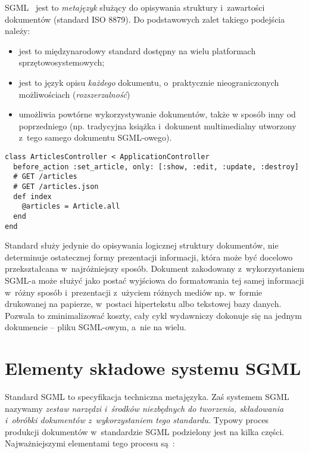\documentclass[brudnopis]{xmgr}
\begin{document}
SGML~\cite{Goldfarb:2002:CFG} jest to \emph{metajęzyk} służący do opisywania
struktury i~zawartości dokumentów (standard ISO 8879).  Do
podstawowych zalet takiego podejścia należy:
\begin{itemize}
\item
jest to międzynarodowy
standard dostępny na wielu platformach sprzętowo\-systemowych;
\item
jest to
język opisu \emph{każdego\/} dokumentu, o~praktycznie nieograniczonych
możliwościach (\emph{rozszerzalność\/})
\item
umożliwia powtórne
wykorzystywanie dokumentów, także w sposób inny od poprzedniego
(np. tradycyjna książka i~dokument multimedialny utworzony z~tego
samego dokumentu SGML-owego).
\end{itemize}

\begin{verbatim}
class ArticlesController < ApplicationController
  before_action :set_article, only: [:show, :edit, :update, :destroy]
  # GET /articles
  # GET /articles.json
  def index
    @articles = Article.all
  end
end
\end{verbatim}

Standard służy jedynie do opisywania logicznej struktury dokumentów,
nie determinuje ostatecznej formy prezentacji informacji, która może
być docelowo przekształcana w~najróżniejszy sposób. Dokument
zakodowany z~wykorzystaniem SGML-a może służyć jako postać wyjściowa
do formatowania tej samej informacji w~różny sposób i~prezentacji
z~użyciem różnych mediów np. w~formie drukowanej na papierze,
w~postaci hipertekstu albo tekstowej bazy danych. Pozwala to
zminimalizować koszty, cały cykl wydawniczy dokonuje się
na jednym dokumencie -- pliku SGML-owym, a~nie na wielu.

\section{Elementy składowe systemu SGML}

Standard SGML to specyfikacja techniczna metajęzyka. Zaś systemem
SGML nazywamy \emph{zestaw narzędzi i~środków niezbędnych do
tworzenia, składowania i~obróbki dokumentów z~wykorzystaniem tego
standardu}.  Typowy proces produkcji dokumentów w~standardzie SGML
podzielony jest na kilka części. Najważniejszymi elementami tego
procesu są~\cite[s.~45--47]{Eisenberg:2002:SXM}:
\end{document}
